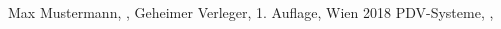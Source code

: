 \begin{thebibliography}{XXXXXX}
    \thispagestyle{fancy}
     Max Mustermann, , Geheimer Verleger, 1. Auflage, Wien 2018
     PDV-Systeme, , \\ 
 \end{thebibliography}

